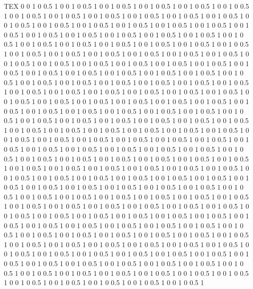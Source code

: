 TEX
0 0 1 0 0.5 1
0 0 1 0 0.5 1
0 0 1 0 0.5 1
0 0 1 0 0.5 1
0 0 1 0 0.5 1
0 0 1 0 0.5 1
0 0 1 0 0.5 1
0 0 1 0 0.5 1
0 0 1 0 0.5 1
0 0 1 0 0.5 1
0 0 1 0 0.5 1
0 0 1 0 0.5 1
0 0 1 0 0.5 1
0 0 1 0 0.5 1
0 0 1 0 0.5 1
0 0 1 0 0.5 1
0 0 1 0 0.5 1
0 0 1 0 0.5 1
0 0 1 0 0.5 1
0 0 1 0 0.5 1
0 0 1 0 0.5 1
0 0 1 0 0.5 1
0 0 1 0 0.5 1
0 0 1 0 0.5 1
0 0 1 0 0.5 1
0 0 1 0 0.5 1
0 0 1 0 0.5 1
0 0 1 0 0.5 1
0 0 1 0 0.5 1
0 0 1 0 0.5 1
0 0 1 0 0.5 1
0 0 1 0 0.5 1
0 0 1 0 0.5 1
0 0 1 0 0.5 1
0 0 1 0 0.5 1
0 0 1 0 0.5 1
0 0 1 0 0.5 1
0 0 1 0 0.5 1
0 0 1 0 0.5 1
0 0 1 0 0.5 1
0 0 1 0 0.5 1
0 0 1 0 0.5 1
0 0 1 0 0.5 1
0 0 1 0 0.5 1
0 0 1 0 0.5 1
0 0 1 0 0.5 1
0 0 1 0 0.5 1
0 0 1 0 0.5 1
0 0 1 0 0.5 1
0 0 1 0 0.5 1
0 0 1 0 0.5 1
0 0 1 0 0.5 1
0 0 1 0 0.5 1
0 0 1 0 0.5 1
0 0 1 0 0.5 1
0 0 1 0 0.5 1
0 0 1 0 0.5 1
0 0 1 0 0.5 1
0 0 1 0 0.5 1
0 0 1 0 0.5 1
0 0 1 0 0.5 1
0 0 1 0 0.5 1
0 0 1 0 0.5 1
0 0 1 0 0.5 1
0 0 1 0 0.5 1
0 0 1 0 0.5 1
0 0 1 0 0.5 1
0 0 1 0 0.5 1
0 0 1 0 0.5 1
0 0 1 0 0.5 1
0 0 1 0 0.5 1
0 0 1 0 0.5 1
0 0 1 0 0.5 1
0 0 1 0 0.5 1
0 0 1 0 0.5 1
0 0 1 0 0.5 1
0 0 1 0 0.5 1
0 0 1 0 0.5 1
0 0 1 0 0.5 1
0 0 1 0 0.5 1
0 0 1 0 0.5 1
0 0 1 0 0.5 1
0 0 1 0 0.5 1
0 0 1 0 0.5 1
0 0 1 0 0.5 1
0 0 1 0 0.5 1
0 0 1 0 0.5 1
0 0 1 0 0.5 1
0 0 1 0 0.5 1
0 0 1 0 0.5 1
0 0 1 0 0.5 1
0 0 1 0 0.5 1
0 0 1 0 0.5 1
0 0 1 0 0.5 1
0 0 1 0 0.5 1
0 0 1 0 0.5 1
0 0 1 0 0.5 1
0 0 1 0 0.5 1
0 0 1 0 0.5 1
0 0 1 0 0.5 1
0 0 1 0 0.5 1
0 0 1 0 0.5 1
0 0 1 0 0.5 1
0 0 1 0 0.5 1
0 0 1 0 0.5 1
0 0 1 0 0.5 1
0 0 1 0 0.5 1
0 0 1 0 0.5 1
0 0 1 0 0.5 1
0 0 1 0 0.5 1
0 0 1 0 0.5 1
0 0 1 0 0.5 1
0 0 1 0 0.5 1
0 0 1 0 0.5 1
0 0 1 0 0.5 1
0 0 1 0 0.5 1
0 0 1 0 0.5 1
0 0 1 0 0.5 1
0 0 1 0 0.5 1
0 0 1 0 0.5 1
0 0 1 0 0.5 1
0 0 1 0 0.5 1
0 0 1 0 0.5 1
0 0 1 0 0.5 1
0 0 1 0 0.5 1
0 0 1 0 0.5 1
0 0 1 0 0.5 1
0 0 1 0 0.5 1
0 0 1 0 0.5 1
0 0 1 0 0.5 1
0 0 1 0 0.5 1
0 0 1 0 0.5 1
0 0 1 0 0.5 1
0 0 1 0 0.5 1
0 0 1 0 0.5 1
0 0 1 0 0.5 1
0 0 1 0 0.5 1
0 0 1 0 0.5 1
0 0 1 0 0.5 1
0 0 1 0 0.5 1
0 0 1 0 0.5 1
0 0 1 0 0.5 1
0 0 1 0 0.5 1
0 0 1 0 0.5 1
0 0 1 0 0.5 1
0 0 1 0 0.5 1
0 0 1 0 0.5 1
0 0 1 0 0.5 1
0 0 1 0 0.5 1
0 0 1 0 0.5 1
0 0 1 0 0.5 1
0 0 1 0 0.5 1
0 0 1 0 0.5 1
0 0 1 0 0.5 1
0 0 1 0 0.5 1
0 0 1 0 0.5 1
0 0 1 0 0.5 1
0 0 1 0 0.5 1
0 0 1 0 0.5 1
0 0 1 0 0.5 1
0 0 1 0 0.5 1
0 0 1 0 0.5 1
0 0 1 0 0.5 1
0 0 1 0 0.5 1
0 0 1 0 0.5 1
0 0 1 0 0.5 1
0 0 1 0 0.5 1
0 0 1 0 0.5 1
0 0 1 0 0.5 1
0 0 1 0 0.5 1
0 0 1 0 0.5 1
0 0 1 0 0.5 1
0 0 1 0 0.5 1
0 0 1 0 0.5 1
0 0 1 0 0.5 1
0 0 1 0 0.5 1
0 0 1 0 0.5 1
0 0 1 0 0.5 1
0 0 1 0 0.5 1
0 0 1 0 0.5 1
0 0 1 0 0.5 1
0 0 1 0 0.5 1
0 0 1 0 0.5 1
0 0 1 0 0.5 1
0 0 1 0 0.5 1
0 0 1 0 0.5 1
